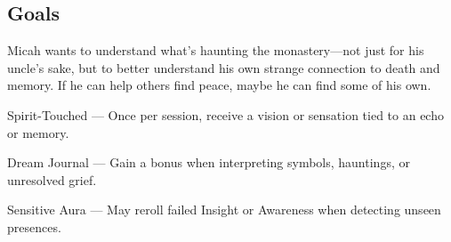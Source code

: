 \documentclass[nodeprecatedcode,bg=print]{dndbook/dndbook}
\begin{document}
\begin{WyrdCharacterSheet}
    \subsection{Goals}
    Micah wants to understand what’s haunting the monastery—not just for his uncle’s sake, but to better understand his own strange connection to death and memory. If he can help others find peace, maybe he can find some of his own.
  
    \begin{WyrdStatsBlock}[profile=img/characters/micah_rios]
        \SkillsBox[%
            expert={Empathy},%
            skilled={Insight, Lore},%
            novice={Discipline, Fight, Persuasion},%
        ]
  
        \begin{TraitsBox}
            \item[Spirit-Touched] — Once per session, receive a vision or sensation tied to an echo or memory.
            \item[Dream Journal] — Gain a bonus when interpreting symbols, hauntings, or unresolved grief.
            \item[Sensitive Aura] — May reroll failed Insight or Awareness when detecting unseen presences.
        \end{TraitsBox}
  
        \DamageBox[%
        ]
    \end{WyrdStatsBlock}
\end{WyrdCharacterSheet}
  
\end{document}
